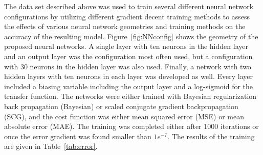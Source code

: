 \documentclass[11pt]{ucthesis}
\begin{document}
The data set described above was used to train several different neural network configurations by utilizing different gradient decent training methods to assess the effects of various neural network geometries and training methods on the accuracy of the resulting model. Figure~\ref{fig:NNconfig} shows the geometry of the proposed neural networks. A single layer with ten neurons in the hidden layer and an output layer was the configuration most often used, but a configuration with 30 neurons in the hidden layer was also used. Finally, a network with two hidden layers with ten neurons in each layer was developed as well. Every layer included a biasing variable including the output layer and a log-sigmoid for the transfer function. The networks were either trained with Bayesian regularization back propagation (Bayesian) or scaled conjugate gradient backpropagation (SCG), and the cost function was either mean squared error (MSE) or mean absolute error (MAE). The training was completed either after 1000 iterations or once the error gradient was found smaller than $1e^{-7}$. The results of the training are given in Table~\ref{tab:error}.
\end{document}
